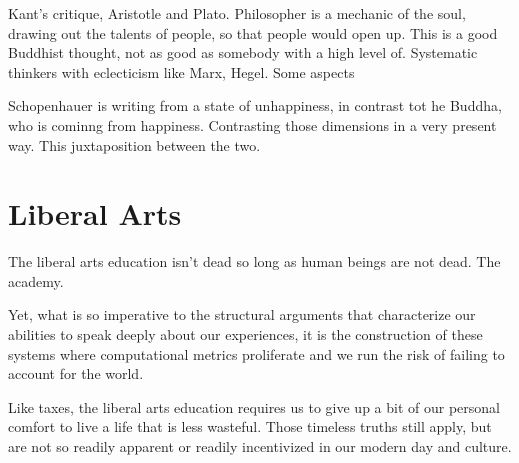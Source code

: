 \documentclass[12pt,letterpaper]{article}
\begin{document}
Kant's critique, Aristotle and Plato.  Philosopher is a mechanic of the soul, drawing out the talents of people, so that people would open up.  This is a good Buddhist thought, not as good as somebody with a high level of.  Systematic thinkers with eclecticism like Marx, Hegel.  Some aspects 

Schopenhauer is writing from a state of unhappiness, in contrast tot he Buddha, who is cominng from happiness.  Contrasting those dimensions in a very present way.  This juxtaposition between the two.  

\section{Liberal Arts}
The liberal arts education isn't dead so long as human beings are not dead.  The academy. 

Yet, what is so imperative to the structural arguments that characterize our abilities to speak deeply about our experiences, it is the construction of these systems where computational metrics proliferate and we run the risk of failing to account for the world.

Like taxes, the liberal arts education requires us to give up a bit of our personal comfort to live a life that is less wasteful.  Those timeless truths still apply, but are not so readily apparent or readily incentivized in our modern day and culture.
\end{document}
